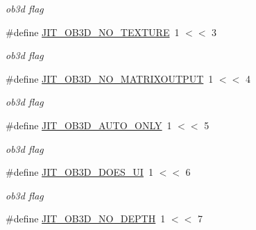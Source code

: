 \begin{DoxyCompactItemize}
\begin{DoxyCompactList}\small\item\em ob3d flag \item\end{DoxyCompactList}\item 
\hypertarget{group__jitter_gaf7d77e7694341904bdbd7440ae71d42e}{
\#define \hyperlink{group__jitter_gaf7d77e7694341904bdbd7440ae71d42e}{JIT\_\-OB3D\_\-NO\_\-TEXTURE}~1 $<$$<$ 3}
\label{group__jitter_gaf7d77e7694341904bdbd7440ae71d42e}

\begin{DoxyCompactList}\small\item\em ob3d flag \item\end{DoxyCompactList}\item 
\hypertarget{group__jitter_ga015276252d0ad61f9f35ad1ea227d089}{
\#define \hyperlink{group__jitter_ga015276252d0ad61f9f35ad1ea227d089}{JIT\_\-OB3D\_\-NO\_\-MATRIXOUTPUT}~1 $<$$<$ 4}
\label{group__jitter_ga015276252d0ad61f9f35ad1ea227d089}

\begin{DoxyCompactList}\small\item\em ob3d flag \item\end{DoxyCompactList}\item 
\hypertarget{group__jitter_ga63a89334c5c06f92792333d191b71b06}{
\#define \hyperlink{group__jitter_ga63a89334c5c06f92792333d191b71b06}{JIT\_\-OB3D\_\-AUTO\_\-ONLY}~1 $<$$<$ 5}
\label{group__jitter_ga63a89334c5c06f92792333d191b71b06}

\begin{DoxyCompactList}\small\item\em ob3d flag \item\end{DoxyCompactList}\item 
\hypertarget{group__jitter_gaafef09ee7a36fc16e46529783df7cd72}{
\#define \hyperlink{group__jitter_gaafef09ee7a36fc16e46529783df7cd72}{JIT\_\-OB3D\_\-DOES\_\-UI}~1 $<$$<$ 6}
\label{group__jitter_gaafef09ee7a36fc16e46529783df7cd72}

\begin{DoxyCompactList}\small\item\em ob3d flag \item\end{DoxyCompactList}\item 
\hypertarget{group__jitter_gad4a2b2f395618bafbd7faca61106b9f7}{
\#define \hyperlink{group__jitter_gad4a2b2f395618bafbd7faca61106b9f7}{JIT\_\-OB3D\_\-NO\_\-DEPTH}~1 $<$$<$ 7}
\label{group__jitter_gad4a2b2f395618bafbd7faca61106b9f7}


\end{DoxyCompactItemize}
